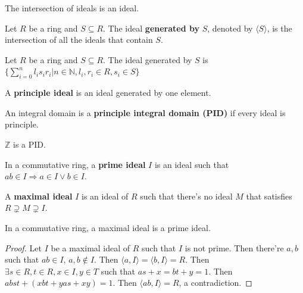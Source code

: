 \documentclass[12pt]{book}
\begin{document}
\begin{lemma}
	The intersection of ideals is an ideal.
\end{lemma}

\begin{definition}
	Let $R$ be a ring and $S\subseteq R$. The ideal {\bf generated by} $S$, denoted by $\langle S\rangle$, is the intersection of all the ideals that contain $S$.
\end{definition}

\begin{lemma}
	Let $R$ be a ring and $S\subseteq R$. The ideal generated by $S$ is $\{\sum_{i=0}^nl_is_ir_i|n\in \mathbb N, l_i,r_i\in R, s_i\in S\}$
\end{lemma}

\begin{definition}
	A {\bf principle ideal} is an ideal generated by one element.
\end{definition}

\begin{definition}
	An integral domain is a {\bf principle integral domain (PID)} if every ideal is principle.
\end{definition}

\begin{example}
	$\mathbb Z$ is a PID.
\end{example}

\begin{definition}
	In a commutative ring, a {\bf prime ideal} $I$ is an ideal such that $ab\in I\Rightarrow a\in I\vee b\in I$.
\end{definition}

\begin{definition}
	A {\bf maximal ideal} $I$ is an ideal of $R$ such that there's no ideal $M$ that satisfies $R\supsetneq M\supsetneq I$.
\end{definition}

\begin{lemma}
	In a commutative ring, a maximal ideal is a prime ideal.
\end{lemma}

\begin{proof}
	Let $I$ be a maximal ideal of $R$ such that $I$ is not prime. Then there're $a,b$ such that $ab\in I$, $a,b\not\in I$. Then $\langle a,I\rangle=\langle b,I\rangle=R$. Then $\exists s\in R,t\in R,x\in I,y\in T$ such that $as+x=bt+y=1$. Then $abst+(xbt+yas+xy)=1$. Then $\langle ab,I\rangle=R$, a contradiction.
\end{proof}
\end{document}
